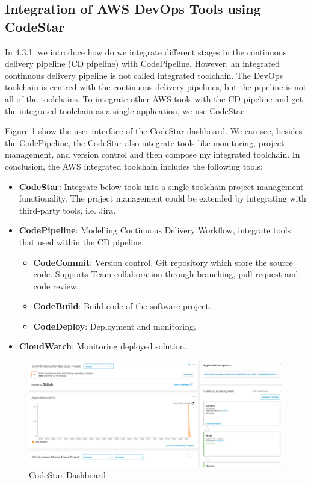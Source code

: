 \subsection{Integration of AWS DevOps Tools using CodeStar}
In 4.3.1, we introduce how do we integrate different stages in the continuous delivery pipeline (CD pipeline) with CodePipeline. However, an integrated continuous delivery pipeline is not called integrated toolchain. The DevOps toolchain is centred with the continuous delivery pipelines, but the pipeline is not all of the toolchains. To integrate other AWS tools with the CD pipeline and get the integrated toolchain as a single application, we use CodeStar.  
\par
Figure \ref{fig:codestar} show the user interface of the CodeStar dashboard. We can see, besides the CodePipeline, the CodeStar also integrate tools like monitoring, project management, and version control and then compose my integrated toolchain. In conclusion, the AWS integrated toolchain includes the following tools:\label{codestar}
\begin{itemize}
     \item \textbf{CodeStar}: Integrate below tools into a single toolchain project management functionality. The project management could be extended by integrating with third-party tools, i.e. Jira.
          \item \textbf{CodePipeline}: Modelling Continuous Delivery Workflow, integrate tools that used within the CD pipeline.
          \begin{itemize}
               \item \textbf{CodeCommit}: Version control. Git repository which store the source code. Supports Team collaboration through branching, pull request and code review.
               \item \textbf{CodeBuild}: Build code of the software project.
               \item \textbf{CodeDeploy}: Deployment and monitoring. 
          \end{itemize}
          \item \textbf{CloudWatch}: Monitoring deployed solution.
\end{itemize}
\begin{figure}[h]
     \centering
     \includegraphics[width=0.99\textwidth]{pics/codestar.png}
     \caption{CodeStar Dashboard}
     \label{fig:codestar}
    \end{figure}

